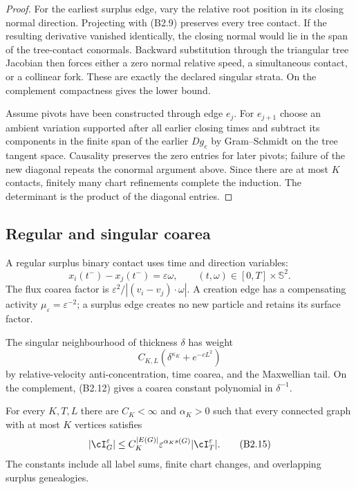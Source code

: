 \begin{proof}
For the earliest surplus edge, vary the relative root position in its closing
normal direction.  Projecting with (B2.9) preserves every tree contact.  If
the resulting derivative vanished identically, the closing normal would lie
in the span of the tree-contact conormals.  Backward substitution through the
triangular tree Jacobian then forces either a zero normal relative speed, a
simultaneous contact, or a collinear fork.  These are exactly the declared
singular strata.  On the complement compactness gives the lower bound.

Assume pivots have been constructed through edge $e_j$.  For $e_{j+1}$ choose
an ambient variation supported after all earlier closing times and subtract
its components in the finite span of the earlier $Dg_e$ by Gram--Schmidt on
the tree tangent space.  Causality preserves the zero entries for later
pivots; failure of the new diagonal repeats the conormal argument above.
Since there are at most $K$ contacts, finitely many chart refinements complete
the induction.  The determinant is the product of the diagonal entries.
\end{proof}

\subsection{Regular and singular coarea}

A regular surplus binary contact uses time and direction variables:
\[
 x_i(t^-)-x_j(t^-)=\varepsilon\omega,\qquad
 (t,\omega)\in[0,T]\times\mathbb S^2.                    \tag{B2.13}
\]
The flux coarea factor is
$\varepsilon^2/|(v_i-v_j)\cdot\omega|$.  A creation edge has a compensating
activity $\mu_\varepsilon=\varepsilon^{-2}$; a surplus edge creates no new
particle and retains its surface factor.

The singular neighbourhood of thickness $\delta$ has weight
\[
 C_{K,L}(\delta^{\kappa_K}+e^{-cL^2})                     \tag{B2.14}
\]
by relative-velocity anti-concentration, time coarea, and the Maxwellian tail.
On the complement, (B2.12) gives a coarea constant polynomial in
$\delta^{-1}$.

\begin{theorem}
\label{thm:r31-b2-loop}
For every $K,T,L$ there are $C_K<\infty$ and $\alpha_K>0$ such that every
connected graph with at most $K$ vertices satisfies
\[
 |\cI_G^\varepsilon|
 \le C_K^{|E(G)|}\varepsilon^{\alpha_Ks(G)}
       |\cI_T^\varepsilon|.                              \tag{B2.15}
\]
The constants include all label sums, finite chart changes, and overlapping
surplus genealogies.
\end{theorem}


